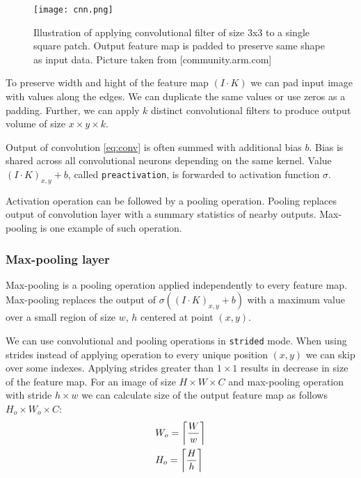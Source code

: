 \begin{figure}
  \texttt{[image: cnn.png]}
  \caption{Illustration of applying convolutional filter of size 3x3 to a single square patch. Output feature map is padded to preserve same shape as input data. Picture taken from [community.arm.com]}
  \label{fig:cnn}
\end{figure}

To preserve width and hight of the feature map $(I \cdot K)$ we can pad input image with values along the edges. We can duplicate the same values or use zeros as a padding.
Further, we can apply $k$ distinct convolutional filters to produce output volume of size $x \times y \times k$.

Output of convolution \ref{eq:conv} is often summed with additional bias $b$.
Bias is shared across all convolutional neurons depending on the same kernel.
Value $(I \cdot K)_{x, y}+b$, called \texttt{preactivation}, is forwarded to activation function $\sigma$.

Activation operation can be followed by a pooling operation.
Pooling replaces output of convolution layer with a summary statistics of nearby outputs.
Max-pooling is one example of such operation.

\subsubsection{Max-pooling layer}

Max-pooling is a pooling operation applied independently to every feature map.
Max-pooling replaces the output of $\sigma((I \cdot K)_{x, y}+b)$ with a maximum value over a small region of size $w$, $h$ centered at point $(x,y)$.

We can use convolutional and pooling operations in \texttt{strided} mode. When using strides instead of applying operation to every unique position $(x, y)$ we can skip over some indexes. Applying strides greater than $1 \times 1$ results in decrease in size of the feature map. For an image of size $H \times W \times C$ and max-pooling operation with stride $h \times w$ we can calculate size of the output feature map as follows $H_o \times W_o \times C $:
\begin{equation*}
  \begin{aligned}
  & W_o = \ceil[\bigg]{\frac{W}{w}} \\
  & H_o = \ceil[\bigg]{\frac{H}{h}} \\
\end{aligned}
\end{equation*}


